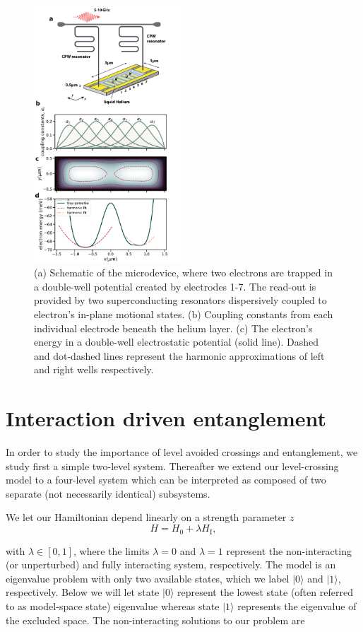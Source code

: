 \documentclass[twocolumn,superscriptaddress,unsortedaddress,
 amsmath,amssymb,
 aps,
]{revtex4-2}
\begin{document}
\begin{figure}
\includegraphics[width=0.49\textwidth]{figure1.pdf}
\caption{\label{fig1} (a) Schematic of the microdevice, where two electrons are trapped in a double-well potential created by electrodes 1-7. The read-out is provided by two superconducting resonators dispersively coupled to  electron's in-plane motional states. (b) Coupling constants from each individual electrode beneath the helium layer. (c) The electron's energy in a  double-well electrostatic potential (solid line). Dashed and dot-dashed lines represent the harmonic approximations of left and right wells respectively.}
\end{figure}

\section{Interaction driven entanglement}

In order to study the importance of level avoided crossings and
entanglement, we study first a simple two-level system. Thereafter we
extend our level-crossing model to a four-level system which can be
interpreted as composed of two separate (not necessarily identical)
subsystems.

We let our Hamiltonian depend linearly on a strength parameter $z$
\[
       H=H_0+\lambda H_\mathrm{I},
\]

with $\lambda \in [0,1]$, where the limits $\lambda=0$ and $\lambda=1$
represent the non-interacting (or unperturbed) and fully interacting
system, respectively.  The model is an eigenvalue problem with only
two available states, which we label $\vert 0\rangle$ and $\vert
1\rangle$, respectively. Below we will let state $\vert 0 \rangle$
represent the lowest state (often referred to as model-space state)
eigenvalue whereas state $\vert 1\rangle$ represents the eigenvalue of
the excluded space.  The non-interacting solutions to our problem are
\end{document}
